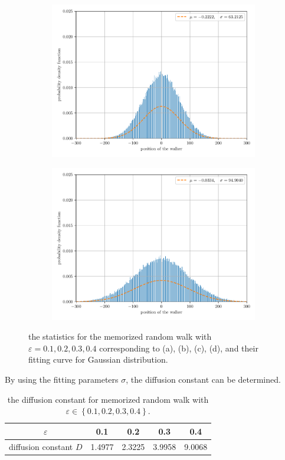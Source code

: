 \documentclass[paper=a4, fontsize=11pt]{scrartcl} %
\numberwithin{equation}{section} %
\numberwithin{figure}{section} %
\numberwithin{table}{section} %
\begin{document}
\begin{figure}[!htbp]
\begin{subfigure}[!b]{0.495\textwidth}
		\includegraphics[width=\linewidth]{figure_1_2.pdf}
		\caption{}
	\end{subfigure}
	\begin{subfigure}[!b]{0.495\textwidth}
		\centering
		\includegraphics[width=\linewidth]{figure_1_3.pdf}
		\caption{}
	\end{subfigure}
	\caption{the statistics for the memorized random walk with \(\varepsilon=0.1,0.2,0.3,0.4\) corresponding to (a), (b), (c), (d), and their fitting curve for Gaussian distribution.}
	\label{fig:random_walk_with_memory}
\end{figure}
By using the fitting parameters \(\sigma\), the diffusion constant can be determined. 
\begin{table}[!ht]
	\centering
	\begin{tabular}{ccccc}
		\toprule
		\(\varepsilon\) & \num{0.1} & \num{0.2} & \num{0.3} & \num{0.4} \\
		\midrule
		diffusion constant \(D\) & \num{1.4977} & \num{2.3225} & \num{3.9958} & \num{9.0068} \\
		\bottomrule
	\end{tabular}
	\caption{the diffusion constant for memorized random walk with \(\varepsilon\in\left\{ 0.1,0.2,0.3,0.4 \right\}\).}
	\label{tab:random_walk_with_memory}
\end{table}
\end{document}
